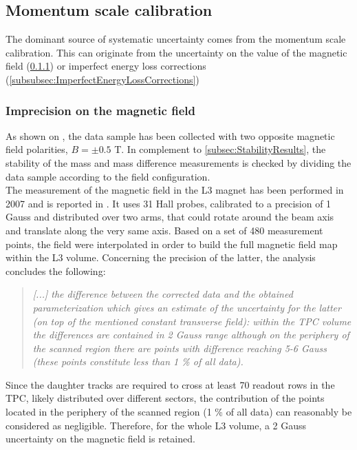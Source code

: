 \subsection{Momentum scale calibration}

The dominant source of systematic uncertainty comes from the momentum scale calibration. This can originate from the uncertainty on the value of the magnetic field (\Sec\ref{subsubsec:ImprecisionMagneticField}) or imperfect energy loss corrections (\Sec\ref{subsubsec:ImperfectEnergyLossCorrections})

\subsubsection{Imprecision on the magnetic field}
\label{subsubsec:ImprecisionMagneticField}

As shown on \fig, the data sample has been collected with two opposite magnetic field polarities, $B = \pm 0.5$ T. In complement to \Sec\ref{subsec:StabilityResults}, the stability of the mass and mass difference measurements is checked by dividing the data sample according to the field configuration. \\


The measurement of the magnetic field in the L3 magnet has been performed in 2007 and is reported in \cite{shahoyanSummaryL3Magnet2007}. It uses 31 Hall probes, calibrated to a precision of 1 Gauss and distributed over two arms, that could rotate around the beam axis and translate along the very same axis. Based on a set of 480 measurement points, the field were interpolated in order to build the full magnetic field map within the L3 volume. Concerning the precision of the latter, the analysis \cite{shahoyanSummaryL3Magnet2007} concludes the following:
\begin{quote}
\textit{ [...] the difference between the corrected data and the obtained parameterization which gives an estimate of the uncertainty for the latter (on top of the mentioned constant transverse field): within the TPC volume the differences are contained in 2 Gauss range although on the periphery of the scanned region there are points with difference reaching 5-6 Gauss (these points constitute less than 1 \% of all data).} 
\end{quote} 

Since the daughter tracks are required to cross at least 70 readout rows in the TPC, likely distributed over different sectors, the contribution of the points located in the periphery of the scanned region (1 \% of all data) can reasonably be considered as negligible. Therefore, for the whole L3 volume, a 2 Gauss uncertainty on the magnetic field is retained.\\

